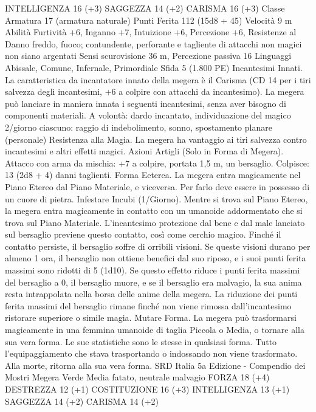 \begin{multicols}{2}
INTELLIGENZA 16 (+3)
SAGGEZZA 14 (+2)
CARISMA 16 (+3)
Classe Armatura 17 (armatura naturale)
Punti Ferita 112 (15d8 + 45)
Velocità 9 m
Abilità Furtività +6, Inganno +7, Intuizione +6, Percezione +6,
Resistenze al Danno freddo, fuoco; contundente, perforante e
tagliente di attacchi non magici non siano argentati
Sensi scurovisione 36 m, Percezione passiva 16
Linguaggi Abissale, Comune, Infernale, Primordiale
Sfida 5 (1.800 PE)
Incantesimi Innati. La caratteristica da incantatore innato della
megera è il Carisma (CD 14 per i tiri salvezza degli incantesimi,
+6 a colpire con attacchi da incantesimo). La megera può
lanciare in maniera innata i seguenti incantesimi, senza aver
bisogno di componenti materiali.
A volontà: dardo incantato, individuazione del magico
2/giorno ciascuno: raggio di indebolimento, sonno, spostamento
planare (personale)
Resistenza alla Magia. La megera ha vantaggio ai tiri salvezza
contro incantesimi e altri effetti magici.
Azioni
Artigli (Solo in Forma di Megera). Attacco con arma da
mischia: +7 a colpire, portata 1,5 m, un bersaglio.
Colpisce: 13 (2d8 + 4) danni taglienti.
Forma Eeterea. La megera entra magicamente nel Piano Etereo
dal Piano Materiale, e viceversa. Per farlo deve essere in
possesso di un cuore di pietra.
Infestare Incubi (1/Giorno). Mentre si trova sul Piano Etereo, la
megera entra magicamente in contatto con un umanoide
addormentato che si trova sul Piano Materiale. L’incantesimo
protezione dal bene e dal male lanciato sul bersaglio previene questo
contatto, così come cerchio magico. Finché il contatto persiste, il
bersaglio soffre di orribili visioni. Se queste visioni durano per
almeno 1 ora, il bersaglio non ottiene benefici dal suo riposo, e i suoi
punti ferita massimi sono ridotti di 5 (1d10). Se questo effetto riduce
i punti ferita massimi del bersaglio a 0, il bersaglio muore, e se il
bersaglio era malvagio, la sua anima resta intrappolata nella borsa
delle anime della megera. La riduzione dei punti ferita massimi del
bersaglio rimane finché non viene rimossa dall’incantesimo ristorare
superiore o simile magia.
Mutare Forma. La megera può trasformarsi magicamente in una
femmina umanoide di taglia Piccola o Media, o tornare alla sua vera
forma. Le sue statistiche sono le stesse in qualsiasi forma. Tutto
l’equipaggiamento che stava trasportando o indossando non viene
trasformato. Alla morte, ritorna alla sua vera forma.
SRD Italia 5a Edizione - Compendio dei Mostri
Megera Verde
Media fatato, neutrale malvagio
FORZA 18 (+4)
DESTREZZA 12 (+1)
COSTITUZIONE 16 (+3)
INTELLIGENZA 13 (+1)
SAGGEZZA 14 (+2)
CARISMA 14 (+2)

\end{multicols}
